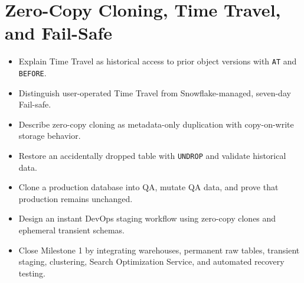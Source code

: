 \chapter{Zero-Copy Cloning, Time Travel, and Fail-Safe}
%
\begin{objectives}
\begin{itemize}
    \item Explain Time Travel as historical access to prior object versions with \texttt{AT} and \texttt{BEFORE}.
    \item Distinguish user-operated Time Travel from Snowflake-managed, seven-day Fail-safe.
    \item Describe zero-copy cloning as metadata-only duplication with copy-on-write storage behavior.
    \item Restore an accidentally dropped table with \texttt{UNDROP} and validate historical data.
    \item Clone a production database into QA, mutate QA data, and prove that production remains unchanged.
    \item Design an instant DevOps staging workflow using zero-copy clones and ephemeral transient schemas.
    \item Close Milestone 1 by integrating warehouses, permanent raw tables, transient staging, clustering, Search Optimization Service, and automated recovery testing.
\end{itemize}
\end{objectives}
